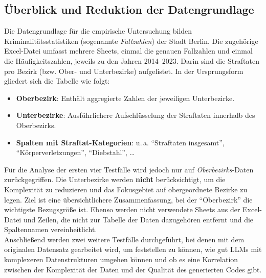 \documentclass[11pt,a4paper]{article}
\begin{document}
\subsection{Überblick und Reduktion der Datengrundlage}
Die Datengrundlage für die empirische Untersuchung bilden Kriminalitätsstatistiken (sogenannte \emph{Fallzahlen}) der Stadt Berlin\cite{opendataberlin}. Die zugehörige Excel-Datei umfasst mehrere Sheets, einmal die genauen Fallzahlen und einmal die Häufigkeitszahlen, jeweils zu den Jahren 2014--2023. Darin sind die Straftaten pro Bezirk (bzw. Ober- und Unterbezirke) aufgelistet. In der Ursprungsform gliedert sich die Tabelle wie folgt:
\begin{itemize}
    \item \textbf{Oberbezirk}: Enthält aggregierte Zahlen der jeweiligen Unterbezirke.
    \item \textbf{Unterbezirke}: Ausführlichere Aufschlüsselung der Straftaten innerhalb des Oberbezirks.
    \item \textbf{Spalten mit Straftat-Kategorien}: u.\,a. \enquote{Straftaten insgesamt}, \enquote{Körperverletzungen}, \enquote{Diebstahl}, \dots
\end{itemize}

Für die Analyse der ersten vier Testfälle wird jedoch nur auf \emph{Oberbezirks}-Daten zurückgegriffen. Die Unterbezirke werden \textbf{nicht} berücksichtigt, um die Komplexität zu reduzieren und das Fokusgebiet auf obergeordnete Bezirke zu legen. Ziel ist eine übersichtlichere Zusammenfassung, bei der \enquote{Oberbezirk} die wichtigste Bezugsgröße ist. Ebenso werden nicht verwendete Sheets aus der Excel-Datei und Zeilen, die nicht zur Tabelle der Daten dazugehören entfernt und die Spaltennamen vereinheitlicht.\\
Anschließend werden zwei weitere Testfälle durchgeführt, bei denen mit dem originalen Datensatz gearbeitet wird, um feststellen zu können, wie gut LLMs mit komplexeren Datenstrukturen umgehen können und ob es eine Korrelation zwischen der Komplexität der Daten und der Qualität des generierten Codes gibt.
\end{document}
